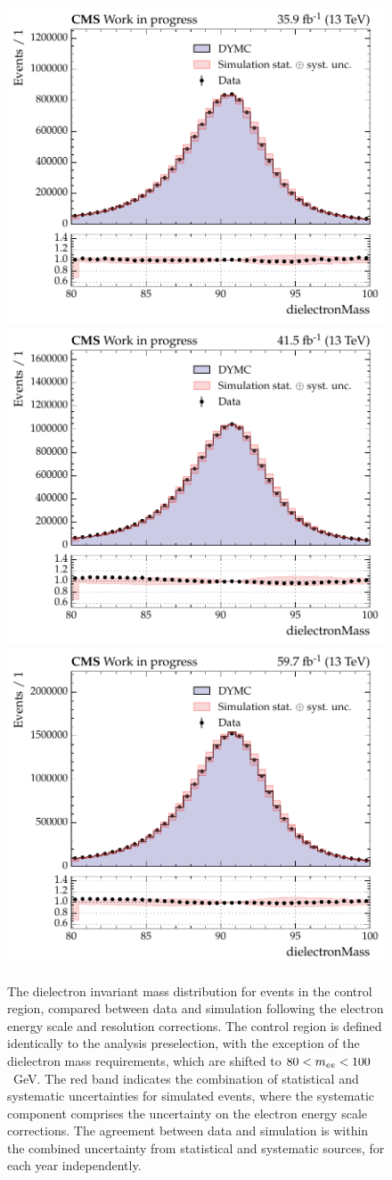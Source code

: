 \begin{figure}[htbp!]
\centering
\includegraphics[width =0.46\linewidth]{Figures/Hee/simulationCorrections/DY/DY_validation_ggH_BDT_dielectronMass_2016.pdf}\hfill%
\includegraphics[width =0.46\linewidth]{Figures/Hee/simulationCorrections/DY/DY_validation_ggH_BDT_dielectronMass_2017.pdf}\hfill\\%
\includegraphics[width =0.46\linewidth]{Figures/Hee/simulationCorrections/DY/DY_validation_ggH_BDT_dielectronMass_2018.pdf}\hfill%
\caption[Dielectron invariant mass distributions for \Zee events in the \Hee control region.]{The dielectron invariant mass distribution for \Zee events in the \Hee control region, compared between data and simulation following the electron energy scale and resolution corrections. The control region is defined identically to the analysis preselection, with the exception of the dielectron mass requirements, which are shifted to $80<m_{ee}<100$~GeV. The red band indicates the combination of statistical and systematic uncertainties for simulated \Zee events, where the systematic component comprises the uncertainty on the electron energy scale corrections. The agreement between data and simulation is within the combined uncertainty from statistical and systematic sources, for each year independently.} 
\label{fig:hee_mee_scales_smearings}            
\end{figure}

